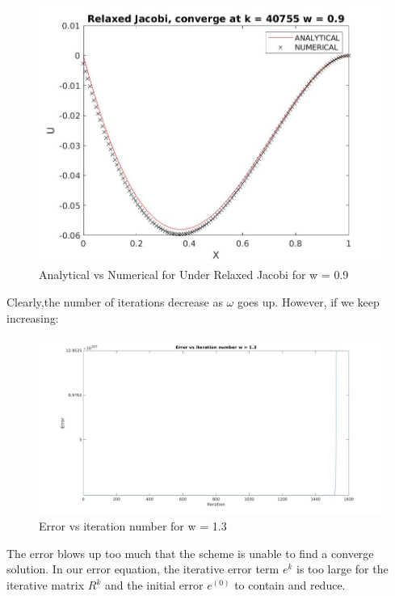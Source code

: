 \documentclass{article}
\begin{document}
\begin{figure}[H]
	\includegraphics[width=\linewidth]{jacobi90.jpg}	
	
	\caption{Analytical vs Numerical for Under Relaxed Jacobi for w = 0.9}
\end{figure}

\noindent
Clearly,the number of iterations decrease as $\omega$ goes up. However, if we keep increasing: 

\begin{figure}[H]
	\includegraphics[width=\linewidth]{jacobi_error_blow.jpg}	
	
	\caption{Error vs iteration number for w = 1.3}
\end{figure}

\noindent
The error blows up too much that the scheme is unable to find a converge solution. In our error equation, the iterative error term $e^k$ is too large for the iterative matrix $R^k$ and the initial error $e^{(0)}$ to contain and reduce. 
\end{document}
